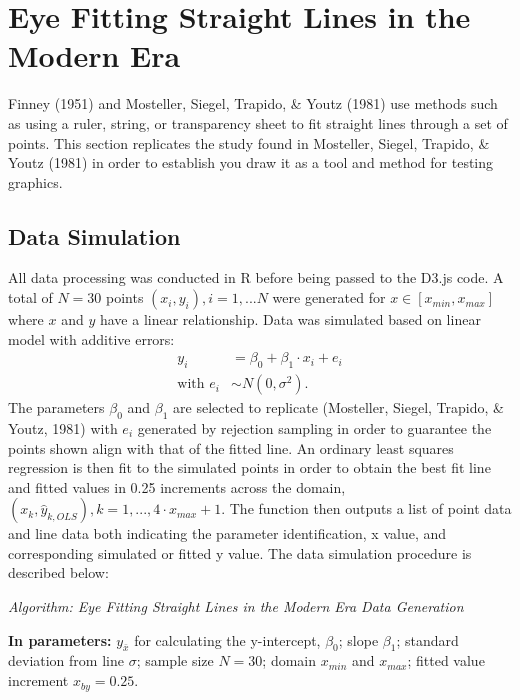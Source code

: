 \documentclass[print]{nuthesis}
\begin{document}
\hypertarget{eye-fitting-straight-lines-in-the-modern-era}{%
\section{Eye Fitting Straight Lines in the Modern Era}\label{eye-fitting-straight-lines-in-the-modern-era}}

Finney (1951) and Mosteller, Siegel, Trapido, \& Youtz (1981) use methods such as using a ruler, string, or transparency sheet to fit straight lines through a set of points.
This section replicates the study found in Mosteller, Siegel, Trapido, \& Youtz (1981) in order to establish you draw it as a tool and method for testing graphics.

\hypertarget{data-simulation}{%
\subsection{Data Simulation}\label{data-simulation}}

All data processing was conducted in R before being passed to the D3.js code.
A total of \(N = 30\) points \((x_i, y_i), i = 1,...N\) were generated for \(x\in [x_{min}, x_{max}]\) where \(x\) and \(y\) have a linear relationship.
Data was simulated based on linear model with additive errors:
\begin{align}
y_i & = \beta_0 + \beta_1 \cdot x_i + e_i \\
\text{with } e_i & \sim N(0, \sigma^2). \nonumber
\end{align}
The parameters \(\beta_0\) and \(\beta_1\) are selected to replicate (Mosteller, Siegel, Trapido, \& Youtz, 1981) with \(e_i\) generated by rejection sampling in order to guarantee the points shown align with that of the fitted line.
An ordinary least squares regression is then fit to the simulated points in order to obtain the best fit line and fitted values in 0.25 increments across the domain, \((x_k, \hat y_{k,OLS}), k = 1, ..., 4\cdot x_{max} +1\).
The function then outputs a list of point data and line data both indicating the parameter identification, x value, and corresponding simulated or fitted y value.
The data simulation procedure is described below:

\noindent \textit{Algorithm: Eye Fitting Straight Lines in the Modern Era Data Generation}

\noindent \textbf{In parameters:} \(y_{\bar{x}}\) for calculating the y-intercept, \(\beta_0\); slope \(\beta_1\); standard deviation from line \(\sigma\); sample size \(N = 30\); domain \(x_{min}\) and \(x_{max}\); fitted value increment \(x_{by} = 0.25\).
\end{document}
